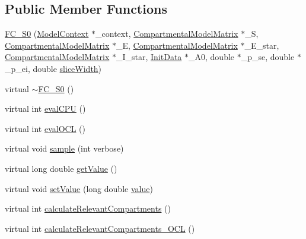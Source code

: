 \subsection*{Public Member Functions}
\begin{DoxyCompactItemize}
\item 
\hyperlink{classSpatialSEIR_1_1FC__S0_ad1af1632228c5bc1c074c06487ea72de}{F\-C\-\_\-\-S0} (\hyperlink{classSpatialSEIR_1_1ModelContext}{Model\-Context} $\ast$\-\_\-context, \hyperlink{classSpatialSEIR_1_1CompartmentalModelMatrix}{Compartmental\-Model\-Matrix} $\ast$\-\_\-\-S, \hyperlink{classSpatialSEIR_1_1CompartmentalModelMatrix}{Compartmental\-Model\-Matrix} $\ast$\-\_\-\-E, \hyperlink{classSpatialSEIR_1_1CompartmentalModelMatrix}{Compartmental\-Model\-Matrix} $\ast$\-\_\-\-E\-\_\-star, \hyperlink{classSpatialSEIR_1_1CompartmentalModelMatrix}{Compartmental\-Model\-Matrix} $\ast$\-\_\-\-I\-\_\-star, \hyperlink{classSpatialSEIR_1_1InitData}{Init\-Data} $\ast$\-\_\-\-A0, double $\ast$\-\_\-p\-\_\-se, double $\ast$\-\_\-p\-\_\-ei, double \hyperlink{classSpatialSEIR_1_1FullConditional_a150ee031af8d086ad0a04b13630a110f}{slice\-Width})
\item 
virtual \hyperlink{classSpatialSEIR_1_1FC__S0_aa49e31d48cfc1466a86ad50246ffb96c}{$\sim$\-F\-C\-\_\-\-S0} ()
\item 
virtual int \hyperlink{classSpatialSEIR_1_1FC__S0_ae52c137dbd299a31a1b2055e924c93c2}{eval\-C\-P\-U} ()
\item 
virtual int \hyperlink{classSpatialSEIR_1_1FC__S0_a9f9e3df7a26de238959461dd6d2511ef}{eval\-O\-C\-L} ()
\item 
virtual void \hyperlink{classSpatialSEIR_1_1FC__S0_a595cb5eceaa9ede016e1f1d341105de6}{sample} (int verbose)
\item 
virtual long double \hyperlink{classSpatialSEIR_1_1FC__S0_ad1b806dbe3573b1e9652850b934d7b10}{get\-Value} ()
\item 
virtual void \hyperlink{classSpatialSEIR_1_1FC__S0_affd898a5e578d7efec9f133f5031cf13}{set\-Value} (long double \hyperlink{classSpatialSEIR_1_1FC__S0_af2c8815ba97a77505a0851c36dc164f5}{value})
\item 
virtual int \hyperlink{classSpatialSEIR_1_1FC__S0_a755fc8e1d69791f6f3883f12a2f1b1c9}{calculate\-Relevant\-Compartments} ()
\item 
virtual int \hyperlink{classSpatialSEIR_1_1FC__S0_ab1c67b9f867ed1e8b9ac27c4f855a102}{calculate\-Relevant\-Compartments\-\_\-\-O\-C\-L} ()
\end{DoxyCompactItemize}
